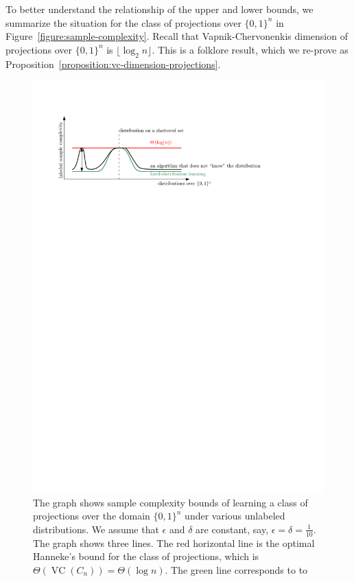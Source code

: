 \documentclass[10pt]{article}
\DeclareMathOperator{\VC}{VC}
\begin{document}
To better understand the relationship of the upper and lower bounds, we
summarize the situation for the class of projections over $\{0,1\}^n$ in
Figure~\ref{figure:sample-complexity}. Recall that Vapnik-Chervonenkis dimension
of projections over $\{0,1\}^n$ is $\lfloor \log_2 n \rfloor$. This is a
folklore result, which we re-prove as
Proposition~\ref{proposition:vc-dimension-projections}.

\begin{figure}
\centering
\includegraphics{figure}
\caption{The graph shows sample complexity bounds of learning a class of
projections over the domain $\{0,1\}^n$ under various unlabeled distributions.
We assume that $\epsilon$ and $\delta$ are constant, say, $\epsilon = \delta =
\frac{1}{10}$. The graph shows three lines. The red horizontal line is the
optimal Hanneke's bound for the class of projections, which is
$\Theta(\VC(C_n)) = \Theta(\log n)$. The green line corresponds to to
}
\end{figure}
\end{document}
